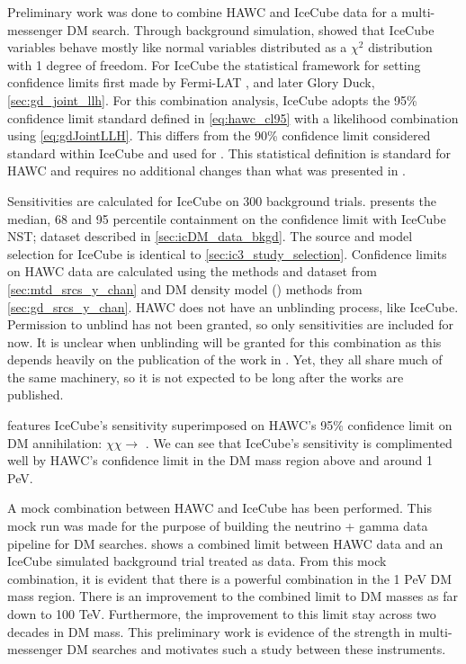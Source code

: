 Preliminary work was done to combine HAWC and IceCube data for a multi-messenger DM search.
Through background simulation,  showed that IceCube variables behave mostly like normal variables distributed as a $\chi^2$ distribution with 1 degree of freedom.
For IceCube the statistical framework for setting confidence limits first made by Fermi-LAT \cite{FermiLAT:dm1}, and later Glory Duck, \cref{sec:gd_joint_llh}.
For this combination analysis, IceCube adopts the 95\% confidence limit standard defined in \cref{eq:hawc_cl95} with a likelihood combination using \cref{eq:gdJointLLH}.
This differs from the 90\% confidence limit considered standard within IceCube and used for .
This statistical definition is standard for HAWC and requires no additional changes than what was presented in .

Sensitivities are calculated for IceCube on 300 background trials.  presents the median, 68 and 95 percentile containment on the confidence limit with IceCube NST; dataset described in \cref{sec:icDM_data_bkgd}.
The source and model selection for IceCube is identical to \cref{sec:ic3_study_selection}.
Confidence limits on HAWC data are calculated using the methods and dataset from \cref{sec:mtd_srcs_y_chan} and DM density model (\GS) methods from \cref{sec:gd_srcs_y_chan}.
HAWC does not have an unblinding process, like IceCube.
Permission to unblind has not been granted, so only sensitivities are included for now.
It is unclear when unblinding will be granted for this combination as this depends heavily on the publication of the work in .
Yet, they all share much of the same machinery, so it is not expected to be long after the works are published.

 features IceCube's sensitivity superimposed on HAWC's 95\% confidence limit on DM annihilation: $\chi\chi \rightarrow$ \parpar{\nu_\mu}.
We can see that IceCube's sensitivity is complimented well by HAWC's confidence limit in the DM mass region above and around 1 PeV.

A mock combination between HAWC and IceCube has been performed.
This mock run was made for the purpose of building the neutrino + gamma data pipeline for DM searches.
 shows a combined limit between HAWC data and an IceCube simulated background trial treated as data.
From this mock combination, it is evident that there is a powerful combination in the 1 PeV DM mass region.
There is an improvement to the combined limit to DM masses as far down to 100 TeV.
Furthermore, the improvement to this limit stay across two decades in DM mass.
This preliminary work is evidence of the strength in multi-messenger DM searches and motivates such a study between these instruments.

